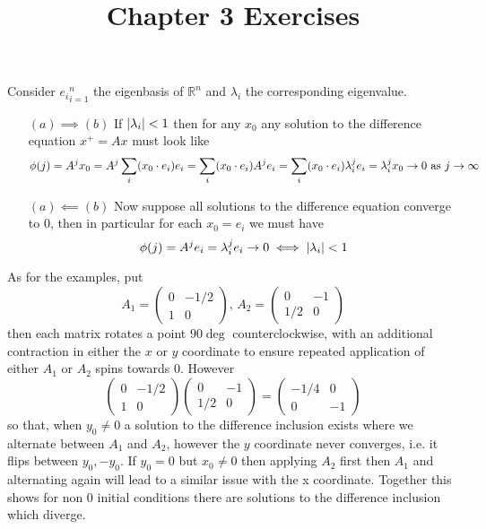 \documentclass{article}
\title{Chapter 3 Exercises}
\newenvironment{ex}[1]
  {\renewcommand\theexercise{#1}\exercise}
  {\endexercise}
\newcommand{\R}[1]{\mathbb{R}^{#1}}
\begin{document}
\begin{ex}{3.1}
  Consider ${e_i}_{i=1}^n$ the eigenbasis of $\R{n}$ and $\lambda_i$ the corresponding eigenvalue.
  \begin{itemize}
    \item[$(a) \implies (b)$]
      If $\lvert\lambda_i\rvert < 1$ then for any $x_0$ any solution to the difference equation $x^+ = Ax$ must look like
      $$
      \phi(j) = A^j x_0 = A^j \sum_i (x_0 \cdot e_i) e_i = \sum_i (x_0 \cdot e_i) A^j e_i = \sum_i (x_0 \cdot e_i) \lambda_i^j e_i = \lambda_i^j x_0 \to 0 \text{ as } j \to \infty
      $$
    \item[$(a) \impliedby (b)$]
      Now suppose all solutions to the difference equation converge to $0$, then in particular for each $x_0 = e_i$ we must have
      $$
      \phi(j) = A^j e_i = \lambda_i^j e_i \to 0 \iff \lvert\lambda_i\rvert < 1
      $$
  \end{itemize}
  As for the examples, put
  $$
  A_1 = \begin{pmatrix}
    0 & -1/2 \\
    1 & 0
  \end{pmatrix}, \,
  A_2 = \begin{pmatrix}
    0 & -1 \\
    1/2 & 0
  \end{pmatrix}
  $$
  then each matrix rotates a point $90\deg$ counterclockwise, with an additional contraction in either the $x$ or $y$ coordinate to ensure repeated application of either $A_1$ or $A_2$ spins towards $0$. However
  $$
  \begin{pmatrix}
    0 & -1/2 \\
    1 & 0
  \end{pmatrix}\begin{pmatrix}
    0 & -1 \\
    1/2 & 0
  \end{pmatrix} = \begin{pmatrix}
    -1/4 & 0 \\
    0 & -1
  \end{pmatrix}
  $$
  so that, when $y_0 \ne 0$ a solution to the difference inclusion exists where we alternate between $A_1$ and $A_2$, however the $y$ coordinate never converges, i.e. it flips between $y_0, -y_0$. If $y_0 = 0$ but $x_0 \ne 0$ then applying $A_2$ first then $A_1$ and alternating again will lead to a similar issue with the x coordinate. Together this shows for non $0$ initial conditions there are solutions to the difference inclusion which diverge.
\end{ex}
\end{document}
